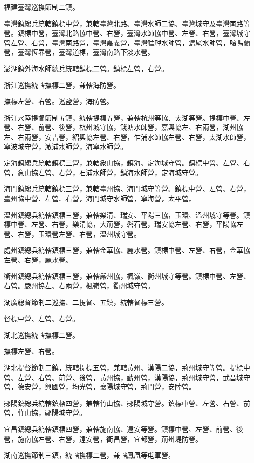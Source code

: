 \begin{pinyinscope}
福建臺灣巡撫節制二鎮。

臺灣鎮總兵統轄鎮標中營，兼轄臺灣北路、臺灣水師二協、臺灣城守及臺灣南路等營。鎮標中營，臺灣北路協中營、右營，臺灣水師協中營、左營、右營，臺灣城守營左營、右營，臺灣南路營，臺灣嘉義營，臺灣艋舺水師營，滬尾水師營，噶嗎蘭營，臺灣恆春營，臺灣道標，臺灣南路下淡水營。

澎湖鎮外海水師總兵統轄鎮標二營。鎮標左營，右營。

浙江巡撫統轄撫標二營，兼轄海防營。

撫標左營、右營。巡鹽營，海防營。

浙江水陸提督節制五鎮，統轄提標五營，兼轄杭州等協、太湖等營。提標中營、左營、右營、前營、後營，杭州城守協，錢塘水師營，嘉興協左、右兩營，湖州協左、右兩營，安吉營，紹興協左營、右營，乍浦水師協左營、右營，太湖水師營，寧波城守營，澉浦水師營，海寧水師營。

定海鎮總兵統轄鎮標三營，兼轄象山協，鎮海、定海城守營。鎮標中營、左營、右營，象山協左營、右營，石浦水師營，鎮海水師營，定海城守營。

海門鎮總兵統轄鎮標三營，兼轄臺州協、海門城守等營。鎮標中營、左營、右營，臺州協中營、左營、右營，海門城守水師營，寧海營，太平營。

溫州鎮總兵統轄鎮標三營，兼轄樂清、瑞安、平陽三協，玉環、溫州城守等營。鎮標中營、左營、右營，樂清協，大荊營，磐石營，瑞安協左營、右營，平陽協左營、右營，玉環營左營、右營，溫州城守營。

處州鎮總兵統轄鎮標三營，兼轄金華協、麗水營。鎮標中營、左營、右營，金華協左營、右營，麗水營。

衢州鎮總兵統轄鎮標三營，兼轄嚴州協，楓嶺、衢州城守等營。鎮標中營、左營、右營。嚴州協左、右兩營，楓嶺營，衢州城守營。

湖廣總督節制二巡撫、二提督、五鎮，統轄督標三營。

督標中營、左營、右營。

湖北巡撫統轄撫標二營。

撫標左營、右營。

湖北提督節制二鎮，統轄提標五營，兼轄黃州、漢陽二協，荊州城守等營。提標中營、左營、右營、前營、後營，黃州協，蘄州營，漢陽協，荊州城守營，武昌城守營，德安營，興國營，均光營，襄陽城守營，荊門營，安陸營。

鄖陽鎮總兵統轄鎮標四營，兼轄竹山協、鄖陽城守營。鎮標中營、左營、右營、前營，竹山協，鄖陽城守營。

宜昌鎮總兵統轄鎮標四營，兼轄施南協、遠安等營。鎮標中營、左營、前營、後營，施南協左營、右營，遠安營，衛昌營，宜都營，荊州堤防營。

湖南巡撫節制三鎮，統轄撫標二營，兼轄鳳凰等屯軍營。


\end{pinyinscope}
